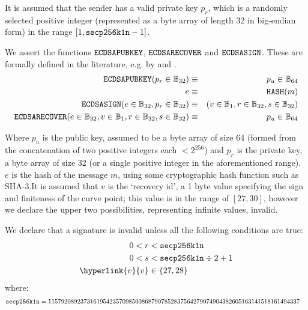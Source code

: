 \documentclass[9pt,oneside]{amsart}
\makeatletter
\newcommand*\eg{e.g.\@\xspace}
\makeatother
\begin{document}
It is assumed that the sender has a valid private key $p_r$, which is a randomly selected positive integer (represented as a byte array of length 32 in big-endian form) in the range \hbox{$[1, \mathtt{\tiny secp256k1n} - 1]$}.

We assert the functions $\mathtt{\small ECDSAPUBKEY}$, $\mathtt{\small ECDSARECOVER}$ and $\mathtt{\small ECDSASIGN}$. These are formally defined in the literature, \eg by \cite{ECDSAcerticom} and \cite{ECDSAWikipedia}.
\begin{eqnarray}
\mathtt{\small ECDSAPUBKEY}(p_r \in \mathbb{B}_{32}) & \equiv & p_u \in \mathbb{B}_{64} \\
\ e & \equiv & \mathtt{\small HASH}(m) \\
\mathtt{\small ECDSASIGN}(e \in \mathbb{B}_{32}, p_r \in \mathbb{B}_{32}) & \equiv & (v \in \mathbb{B}_{1}, r \in \mathbb{B}_{32}, s \in \mathbb{B}_{32}) \\
\mathtt{\small ECDSARECOVER}(e \in \mathbb{B}_{32}, v \in \mathbb{B}_{1}, r \in \mathbb{B}_{32}, s \in \mathbb{B}_{32}) & \equiv & p_u \in \mathbb{B}_{64}
\end{eqnarray}

Where $p_u$ is the public key, assumed to be a byte array of size 64 (formed from the concatenation of two positive integers each $< 2^{256}$) and $p_r$ is the private key, a byte array of size 32 (or a single positive integer in the aforementioned range). $e$ is the hash of the message $m$, using some cryptographic hash function such as SHA-3.\hypertarget{v}{It is assumed that $v$ is the `recovery id', a 1 byte value specifying the sign and finiteness of the curve point; this value is in the range of $[27, 30]$, however we declare the upper two possibilities, representing infinite values, invalid.} 

\newcommand{\slimit}{\ensuremath{\text{s-limit}}}

We declare that a signature is invalid unless all the following conditions are true:
\begin{align}
0 < r &< \mathtt{\tiny secp256k1n} \\
0 < s &< \mathtt{\tiny secp256k1n} \div 2 + 1 \\
\hyperlink{v}{v} &\in \{27,28\}
\end{align}
where:
\begin{align}
\mathtt{\tiny secp256k1n} &= 115792089237316195423570985008687907852837564279074904382605163141518161494337
\end{align}
\end{document}
